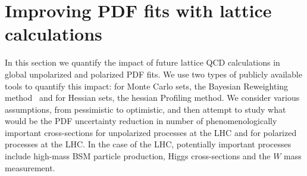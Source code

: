 \section{Improving PDF fits with lattice calculations}

In this section we quantify the impact of future lattice QCD calculations
in global unpolarized and polarized PDF fits.
%
We use two types of publicly available tools to quantify this
impact: for Monte Carlo sets, the Bayesian Reweighting
method~\cite{Ball:2011gg,Ball:2010gb} and for Hessian sets,
the hessian Profiling method.
%
We consider various assumptions, from pessimistic to optimistic,
and then attempt to study what would be the PDF uncertainty
reduction in number of phenomenologically
important cross-sections for unpolarized processes at the
LHC and for polarized processes at the LHC.
%
In the case of the LHC, potentially important processes include
high-mass BSM particle production, Higgs cross-sections and
the $W$ mass measurement.

